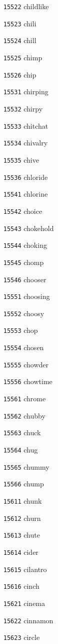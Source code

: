 \documentclass[twoside,11pt]{article}
\begin{document}
\begin{multicols}{5}
\begin{enumerate}
\item[\texttt{15522}] childlike
\item[\texttt{15523}] chili
\item[\texttt{15524}] chill
\item[\texttt{15525}] chimp
\item[\texttt{15526}] chip
\item[\texttt{15531}] chirping
\item[\texttt{15532}] chirpy
\item[\texttt{15533}] chitchat
\item[\texttt{15534}] chivalry
\item[\texttt{15535}] chive
\item[\texttt{15536}] chloride
\item[\texttt{15541}] chlorine
\item[\texttt{15542}] choice
\item[\texttt{15543}] chokehold
\item[\texttt{15544}] choking
\item[\texttt{15545}] chomp
\item[\texttt{15546}] chooser
\item[\texttt{15551}] choosing
\item[\texttt{15552}] choosy
\item[\texttt{15553}] chop
\item[\texttt{15554}] chosen
\item[\texttt{15555}] chowder
\item[\texttt{15556}] chowtime
\item[\texttt{15561}] chrome
\item[\texttt{15562}] chubby
\item[\texttt{15563}] chuck
\item[\texttt{15564}] chug
\item[\texttt{15565}] chummy
\item[\texttt{15566}] chump
\item[\texttt{15611}] chunk
\item[\texttt{15612}] churn
\item[\texttt{15613}] chute
\item[\texttt{15614}] cider
\item[\texttt{15615}] cilantro
\item[\texttt{15616}] cinch
\item[\texttt{15621}] cinema
\item[\texttt{15622}] cinnamon
\item[\texttt{15623}] circle

\end{enumerate}
\end{multicols}
\end{document}
